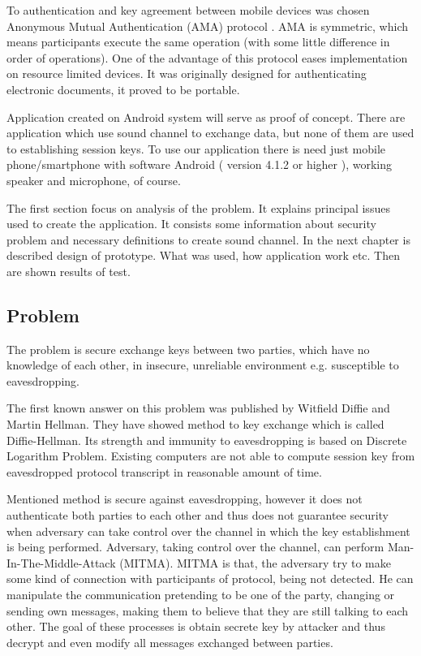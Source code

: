 \documentclass[11pt,titlepage]{article}
\theoremstyle{plain}
\begin{document}
\vspace{5mm}

To authentication and key agreement between mobile devices was chosen Anonymous Mutual Authentication (AMA) protocol \cite{AMA}. AMA is symmetric, which means  participants execute the same operation (with some little difference in order of operations). One of
the advantage of this protocol eases implementation on resource limited devices. It was originally designed for authenticating electronic documents, it proved to be portable.

\vspace{5mm}

Application created on Android system will serve as proof of concept. There are application which use sound channel to exchange data, but none of them are used to establishing session keys. To use our application there is need just mobile phone/smartphone with software Android ( version 4.1.2 or higher ), working speaker and microphone, of course.

\vspace{5mm}

The first section focus on analysis of the problem. It explains principal issues used to create the application. It consists some information about security problem and necessary definitions to create sound channel. In the next chapter is described design of prototype. What was used, how application work etc. Then are shown results of test.


\subsection{Problem}
The problem is secure exchange keys between two parties, which have no knowledge of each other, in insecure, unreliable environment e.g. susceptible to eavesdropping.

\vspace{5mm}

The first known answer on this problem was published by Witfield Diffie and Martin Hellman. They have showed method to key exchange which is called Diffie-Hellman. Its strength and immunity to eavesdropping is based on Discrete Logarithm Problem. Existing computers are not able to compute session key from eavesdropped protocol transcript in reasonable amount of time.

\vspace{5mm}

Mentioned method is secure against eavesdropping, however it does not authenticate both parties to each other and thus does not guarantee security when adversary can take control over the channel in which the key establishment is being performed. Adversary, taking control over the channel, can perform Man-In-The-Middle-Attack (MITMA). MITMA is that, the adversary try to make some kind of connection with participants of protocol, being not detected. He can manipulate the communication pretending to be one of the party, changing or sending own messages, making them to believe that they are still talking to each other. The goal of these processes is obtain secrete key by attacker and thus decrypt and even modify all messages exchanged between parties.
\end{document}
